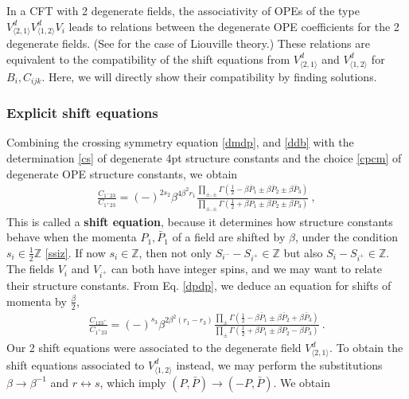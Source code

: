 \documentclass[12pt, a4paper]{article}
\newcommand{\myindex}[1]{\textbf{\boldmath #1}}
\begin{document}
In a CFT with 2 degenerate fields, the associativity of OPEs of the type 
$V^d_{\langle 2,1\rangle}V^d_{\langle 1,2\rangle}V_i$ leads to relations between 
the degenerate OPE coefficients for the 2 degenerate fields. (See \cite[Exercise 3.2]{rib14} for the case of Liouville theory.) These relations are equivalent to the compatibility of the shift equations from $V^d_{\langle 2,1\rangle}$ and $V^d_{\langle 1,2\rangle}$ for $B_i,C_{ijk}$. Here, we will directly show their compatibility by finding solutions.

\subsubsection{Explicit shift equations}

Combining the crossing symmetry equation \eqref{dmdp}, and \eqref{ddb} with the determination \eqref{cs} of degenerate 4pt structure constants and the choice \eqref{cpcm} of degenerate OPE structure constants, we obtain
\begin{align}
 \boxed{\frac{C_{1^-23}}{C_{1^+23}} = 
 (-)^{2s_2}\beta^{4\beta^2r_1} \frac{\prod_{\pm,\pm}\Gamma\left(\tfrac12 -\beta\bar P_1\pm\beta \bar P_2\pm\beta \bar P_3\right)}{\prod_{\pm,\pm}
 \Gamma\left(\tfrac12 +\beta P_1\pm \beta P_2\pm\beta P_3\right)}} \ ,
 \label{sh-mp}
\end{align}
This is called a \myindex{shift equation}, because it determines how structure constants behave when the momenta $P_1,\bar P_1$ of a field are shifted by $\beta$, under the condition $s_i\in \frac12 \mathbb{Z}$ \eqref{ssiz}. If now $s_i\in\mathbb{Z}$, then not only $S_{i^-}-S_{i^+}\in\mathbb{Z}$ but also $S_{i}-S_{i^+}\in\mathbb{Z}$. The fields $V_i$ and $V_{i^+}$ can both have integer spins, and we may want to relate their structure constants. From Eq. \eqref{dpdp}, we deduce an equation for shifts of momenta by $\frac{\beta}{2}$,
\begin{align}
 \boxed{\frac{C_{123^+}}{C_{1^+23}} = 
 (-)^{s_3} \beta^{2\beta^2(r_1-r_3)}
 \frac{ \prod_\pm\Gamma\left(\frac12 -\beta\bar P_1 \pm \beta\bar P_2 +\beta\bar P_3\right)}{ \prod_\pm\Gamma\left(\frac12+\beta P_1 \pm \beta P_2 -\beta P_3\right)}}\ .
 \label{sh-pp}
\end{align}
Our 2 shift equations were associated to the degenerate field $V^d_{\langle 2,1\rangle}$. To obtain the shift equations associated to $V^d_{\langle 1,2\rangle}$ instead, we may perform the substitutions $\beta\to \beta^{-1}$ and $r\leftrightarrow s$, which imply $(P,\bar P)\to (-P,\bar P)$. We obtain 
\end{document}
